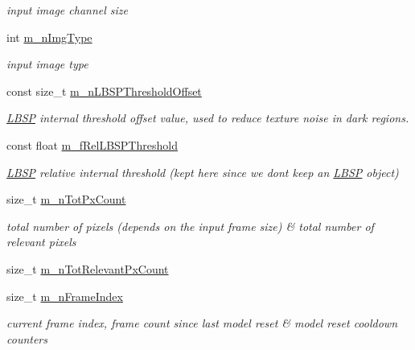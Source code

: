 \begin{DoxyCompactItemize}
\begin{DoxyCompactList}\small\item\em input image channel size \end{DoxyCompactList}\item 
int \mbox{\hyperlink{class_background_subtractor_l_b_s_p_a7d2f52ecd5ff56e42da86f97e0ad93b5}{m\+\_\+n\+Img\+Type}}
\begin{DoxyCompactList}\small\item\em input image type \end{DoxyCompactList}\item 
const size\+\_\+t \mbox{\hyperlink{class_background_subtractor_l_b_s_p_a209eb6aaa34e8ad8e565e79f85404e24}{m\+\_\+n\+L\+B\+S\+P\+Threshold\+Offset}}
\begin{DoxyCompactList}\small\item\em \mbox{\hyperlink{class_l_b_s_p}{L\+B\+SP}} internal threshold offset value, used to reduce texture noise in dark regions. \end{DoxyCompactList}\item 
const float \mbox{\hyperlink{class_background_subtractor_l_b_s_p_ad759c645b14e9b16bf3940cae862df32}{m\+\_\+f\+Rel\+L\+B\+S\+P\+Threshold}}
\begin{DoxyCompactList}\small\item\em \mbox{\hyperlink{class_l_b_s_p}{L\+B\+SP}} relative internal threshold (kept here since we don\textquotesingle{}t keep an \mbox{\hyperlink{class_l_b_s_p}{L\+B\+SP}} object) \end{DoxyCompactList}\item 
size\+\_\+t \mbox{\hyperlink{class_background_subtractor_l_b_s_p_a9d1e247267afbddb7032bdcabd67d931}{m\+\_\+n\+Tot\+Px\+Count}}
\begin{DoxyCompactList}\small\item\em total number of pixels (depends on the input frame size) \& total number of relevant pixels \end{DoxyCompactList}\item 
size\+\_\+t \mbox{\hyperlink{class_background_subtractor_l_b_s_p_ac3b54f4d2dfa3a576475214f26501d85}{m\+\_\+n\+Tot\+Relevant\+Px\+Count}}
\item 
size\+\_\+t \mbox{\hyperlink{class_background_subtractor_l_b_s_p_a8a2350cad84f19c68ef61b7aaf91c43f}{m\+\_\+n\+Frame\+Index}}
\begin{DoxyCompactList}\small\item\em current frame index, frame count since last model reset \& model reset cooldown counters \end{DoxyCompactList}\item 

\end{DoxyCompactItemize}
